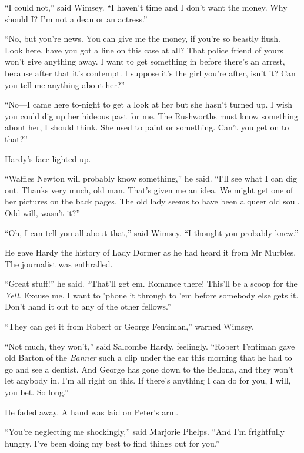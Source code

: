 \enquote{I could not,} said Wimsey. \enquote{I haven't time and I don't want the money. Why should I? I'm not a dean or an actress.}

\enquote{No, but you're news. You can give me the money, if you're so beastly flush. Look here, have you got a line on this case at all? That police friend of yours won't give anything away. I want to get something in before there's an arrest, because after that it's contempt. I suppose it's the girl you're after, isn't it? Can you tell me anything about her?}

\enquote{No\allowbreak---\allowbreak I came here to-night to get a look at her but she hasn't turned up. I wish you could dig up her hideous past for me. The Rushworths must know something about her, I should think. She used to paint or something. Can't you get on to that?}

Hardy's face lighted up.

\enquote{Waffles Newton will probably know something,} he said. \enquote{I'll see what I can dig out. Thanks very much, old man. That's given me an idea. We might get one of her pictures on the back pages. The old lady seems to have been a queer old soul. Odd will, wasn't it?}

\enquote{Oh, I can tell you all about that,} said Wimsey. \enquote{I thought you probably knew.}

He gave Hardy the history of Lady Dormer as he had heard it from Mr Murbles. The journalist was enthralled.

\enquote{Great stuff!} he said. \enquote{That'll get em. Romance there! This'll be a scoop for the \textit{Yell}. Excuse me. I want to 'phone it through to 'em before somebody else gets it. Don't hand it out to any of the other fellows.}

\enquote{They can get it from Robert or George Fentiman,} warned Wimsey.

\enquote{Not much, they won't,} said Salcombe Hardy, feelingly. \enquote{Robert Fentiman gave old Barton of the \textit{Banner} such a clip under the ear this morning that he had to go and see a dentist. And George has gone down to the Bellona, and they won't let anybody in. I'm all right on this. If there's anything I can do for you, I will, you bet. So long.}

He faded away. A hand was laid on Peter's arm.

\enquote{You're neglecting me shockingly,} said Marjorie Phelps. \enquote{And I'm frightfully hungry. I've been doing my best to find things out for you.}

